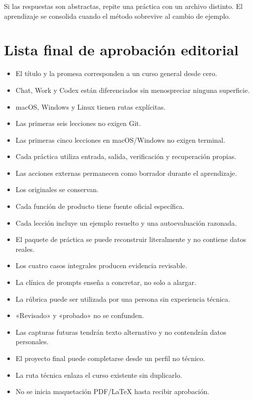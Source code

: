 \documentclass[10pt,a4paper,openany]{book}
\providecommand{\tightlist}{\setlength{\itemsep}{0.18em}\setlength{\parskip}{0pt}}
\begin{document}
Si las respuestas son abstractas, repite una práctica con un archivo
distinto. El aprendizaje se consolida cuando el método sobrevive al
cambio de ejemplo.

\chapter{Lista final de aprobación
editorial}\label{lista-final-de-aprobaciuxf3n-editorial}

\begin{itemize}
\tightlist
\item[$\square$]
  El título y la promesa corresponden a un curso general desde cero.
\item[$\square$]
  Chat, Work y Codex están diferenciados sin menospreciar ninguna
  superficie.
\item[$\square$]
  macOS, Windows y Linux tienen rutas explícitas.
\item[$\square$]
  Las primeras seis lecciones no exigen Git.
\item[$\square$]
  Las primeras cinco lecciones en macOS/Windows no exigen terminal.
\item[$\square$]
  Cada práctica utiliza entrada, salida, verificación y recuperación
  propias.
\item[$\square$]
  Las acciones externas permanecen como borrador durante el aprendizaje.
\item[$\square$]
  Los originales se conservan.
\item[$\square$]
  Cada función de producto tiene fuente oficial específica.
\item[$\square$]
  Cada lección incluye un ejemplo resuelto y una autoevaluación
  razonada.
\item[$\square$]
  El paquete de práctica se puede reconstruir literalmente y no contiene
  datos reales.
\item[$\square$]
  Los cuatro casos integrales producen evidencia revisable.
\item[$\square$]
  La clínica de prompts enseña a concretar, no solo a alargar.
\item[$\square$]
  La rúbrica puede ser utilizada por una persona sin experiencia
  técnica.
\item[$\square$]
  «Revisado» y «probado» no se confunden.
\item[$\square$]
  Las capturas futuras tendrán texto alternativo y no contendrán datos
  personales.
\item[$\square$]
  El proyecto final puede completarse desde un perfil no técnico.
\item[$\square$]
  La ruta técnica enlaza el curso existente sin duplicarlo.
\item[$\square$]
  No se inicia maquetación PDF/LaTeX hasta recibir aprobación.
\end{itemize}
\end{document}
